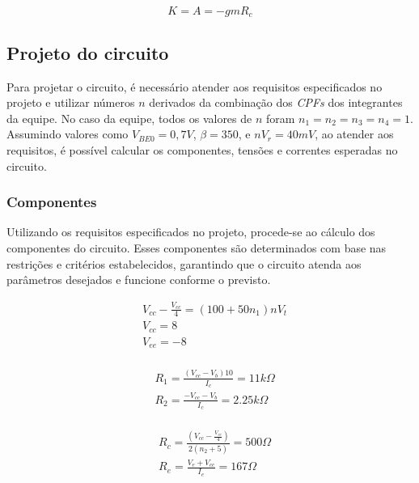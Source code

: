\begin{equation}
    K = A = - gm R_c
\end{equation}


\subsection{Projeto do circuito}

Para projetar o circuito, é necessário atender aos requisitos especificados no projeto e utilizar números $n$ derivados da combinação dos \emph{CPFs} dos integrantes da equipe. No caso da equipe, todos os valores de $n$ foram $n_1 = n_2 = n_3 = n_4 = 1$. Assumindo valores como $V_{BE0} = 0,7 V$, $\beta = 350$, e $n V_r = 40 mV$, ao atender aos requisitos, é possível calcular os componentes, tensões e correntes esperadas no circuito.

\subsubsection{Componentes}

Utilizando os requisitos especificados no projeto, procede-se ao cálculo dos componentes do circuito. Esses componentes são determinados com base nas restrições e critérios estabelecidos, garantindo que o circuito atenda aos parâmetros desejados e funcione conforme o previsto.

\begin{equation}
    \begin{aligned}
         & V_{cc} - \frac{V_{cc}}{4} = (100 + 50 n_1) n V_t \\
         & V_{cc} = 8                                       \\
         & V_{ee} = -8                                      \\
    \end{aligned}
\end{equation}

\begin{equation}
    \begin{aligned}
         & R_1 = \frac{(V_{cc} - V_b)  10}{I_c} = 11 k \varOmega \\
         & R_2 = \frac{- V_{cc} - V_b}{I_c} = 2.25 k \varOmega   \\
    \end{aligned}
\end{equation}

\begin{equation}
    \begin{aligned}
         & R_c = \frac{\left(V_{cc} - \frac{V_{cc}}{4}\right)}{2 (n_2 +5)} = 500\varOmega \\
         & R_e = \frac{V_e + V_{cc}}{I_e} = 167 \varOmega
    \end{aligned}
\end{equation}

